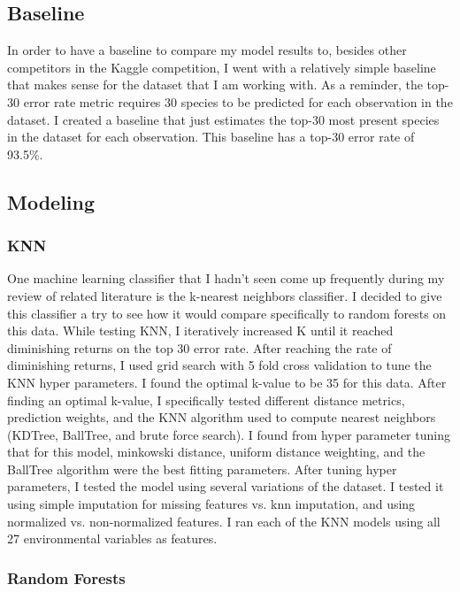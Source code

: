 \documentclass[12pt, oneside]{article}
\begin{document}
\begin{normalsize}
\subsection{Baseline}

In order to have a baseline to compare my model results to, besides other competitors in the Kaggle competition, I went with a relatively simple baseline that makes sense for the dataset that I am working with. As a reminder, the top-30 error rate metric requires 30 species to be predicted for each observation in the dataset. I created a baseline that just estimates the top-30 most present species in the dataset for each observation. This baseline has a top-30 error rate of 93.5\%.

\subsection{Modeling}

\subsubsection{KNN}

One machine learning classifier that I hadn't seen come up frequently during my review of related literature is the k-nearest neighbors classifier. I decided to give this classifier a try to see how it would compare specifically to random forests on this data. While testing KNN, I iteratively increased K until it reached diminishing returns on the top 30 error rate. After reaching the rate of diminishing returns, I used grid search with 5 fold cross validation to tune the KNN hyper parameters. I found the optimal k-value to be 35 for this data. After finding an optimal k-value, I specifically tested different distance metrics, prediction weights, and the KNN algorithm used to compute nearest neighbors (KDTree, BallTree, and brute force search). I found from hyper parameter tuning that for this model, minkowski distance, uniform distance weighting, and the BallTree algorithm were the best fitting parameters. After tuning hyper parameters, I tested the model using several variations of the dataset. I tested it using simple imputation for missing features vs. knn imputation, and using normalized vs. non-normalized features. I ran each of the KNN models using all 27 environmental variables as features.

\subsubsection{Random Forests}


\end{normalsize}
\end{document}
